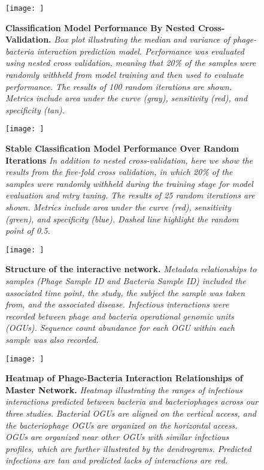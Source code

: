 \documentclass[12pt,]{article}
\begin{document}
\newpage

\begin{figure}[htbp]
\centering
\texttt{[image: ]}
\caption{\textbf{Classification Model Performance By Nested
Cross-Validation.} \emph{Box plot illustrating the median and variance
of phage-bacteria interaction prediction model. Performance was
evaluated using nested cross validation, meaning that 20\% of the
samples were randomly withheld from model training and then used to
evaluate performance. The results of 100 random iterations are shown.
Metrics include area under the curve (gray), sensitivity (red), and
specificity (tan).}\label{nestedperformance}}
\end{figure}

\newpage

\begin{figure}[htbp]
\centering
\texttt{[image: ]}
\caption{\textbf{Stable Classification Model Performance Over Random
Iterations} \emph{In addition to nested cross-validation, here we show
the results from the five-fold cross validation, in which 20\% of the
samples were randomly withheld during the training stage for model
evaluation and mtry tuning. The results of 25 random iterations are
shown. Metrics include area under the curve (red), sensitivity (green),
and specificity (blue). Dashed line highlight the random point of
0.5.}\label{crossval}}
\end{figure}

\newpage

\begin{figure}[htbp]
\centering
\texttt{[image: ]}
\caption{\textbf{Structure of the interactive network.} \emph{Metadata
relationships to samples (Phage Sample ID and Bacteria Sample ID)
included the associated time point, the study, the subject the sample
was taken from, and the associated disease. Infectious interactions were
recorded between phage and bacteria operational genomic units (OGUs).
Sequence count abundance for each OGU within each sample was also
recorded.}\label{NetworkDiagram}}
\end{figure}

\newpage

\begin{figure}[htbp]
\centering
\texttt{[image: ]}
\caption{\textbf{Heatmap of Phage-Bacteria Interaction Relationships of
Master Network.} \emph{Heatmap illustrating the ranges of infectious
interactions predicted between bacteria and bacteriophages across our
three studies. Bacterial OGUs are aligned on the vertical access, and
the bacteriophage OGUs are organized on the horizontal access. OGUs are
organized near other OGUs with similar infectious profiles, which are
further illustrated by the dendrograms. Predicted infections are tan and
predicted lacks of interactions are red.}\label{inthm}}
\end{figure}
\end{document}
